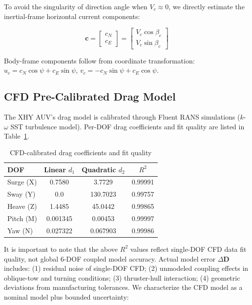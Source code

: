 To avoid the singularity of direction angle when $V_c\approx 0$, we directly estimate the inertial-frame horizontal current components:

\begin{equation}
    \bm{c} = \begin{bmatrix} c_N \\ c_E \end{bmatrix} = \begin{bmatrix} V_c\cos\beta_c \\ V_c\sin\beta_c \end{bmatrix}
    \label{eq:c_inertial}
\end{equation}

Body-frame components follow from coordinate transformation: $u_c = c_N\cos\psi + c_E\sin\psi$, $v_c = -c_N\sin\psi + c_E\cos\psi$.

\subsection{CFD Pre-Calibrated Drag Model}

The XHY AUV's drag model is calibrated through Fluent RANS simulations ($k$-$\omega$ SST turbulence model). Per-DOF drag coefficients and fit quality are listed in Table~\ref{tab:cfd}.

\begin{table}[h]
\centering
\caption{CFD-calibrated drag coefficients and fit quality}
\label{tab:cfd}
\begin{tabular}{lccc}
\toprule
DOF & Linear $d_1$ & Quadratic $d_2$ & $R^2$ \\
\midrule
Surge (X)  & 0.7580  & 3.7729   & 0.99991 \\
Sway (Y)   & 0.0     & 130.7023 & 0.99757 \\
Heave (Z)  & 1.4485  & 45.0442  & 0.99865 \\
Pitch (M)  & 0.001345 & 0.00453 & 0.99997 \\
Yaw (N)    & 0.027322 & 0.067903 & 0.99986 \\
\bottomrule
\end{tabular}
\end{table}

It is important to note that the above $R^2$ values reflect single-DOF CFD data fit quality, not global 6-DOF coupled model accuracy. Actual model error $\Delta\bm{D}$ includes: (1) residual noise of single-DOF CFD; (2) unmodeled coupling effects in oblique-tow and turning conditions; (3) thruster-hull interaction; (4) geometric deviations from manufacturing tolerances. We characterize the CFD model as a nominal model plus bounded uncertainty:


